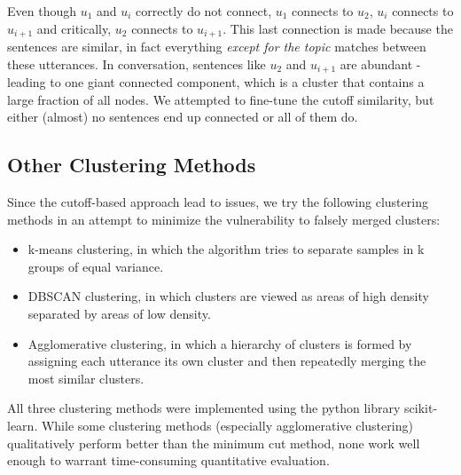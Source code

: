         Even though $u_1$ and $u_{i}$ correctly do not connect, $u_1$ connects to $u_2$, $u_{i}$ connects to $u_{i+1}$ and critically, $u_2$ connects to $u_{i+1}$. This last connection is made because the sentences are similar, in fact everything \textit{except for the topic} matches between these \glspl{utterance}. In conversation, sentences like $u_2$ and $u_{i+1}$ are abundant - leading to one giant connected component, which is a cluster that contains a large fraction of all nodes. We attempted to fine-tune the cutoff similarity, but either (almost) no sentences end up connected or all of them do. 
        
    
    \subsection{Other Clustering Methods}
        Since the cutoff-based approach lead to issues, we try the following clustering methods in an attempt to minimize the vulnerability to falsely merged clusters:
        \begin{itemize}
            \item k-means clustering, in which the algorithm tries to separate samples in k groups of equal variance.
            \item DBSCAN clustering, in which clusters are viewed as areas of high density separated by areas of low density.
            \item Agglomerative clustering, in which a hierarchy of clusters is formed by assigning each \gls{utterance} its own cluster and then repeatedly merging the most similar clusters.
        \end{itemize}
        All three clustering methods were implemented using the python library scikit-learn\cite{scikit-learn}. While some clustering methods (especially agglomerative clustering) qualitatively perform better than the minimum cut method, none work well enough to warrant time-consuming quantitative evaluation.
        
        
